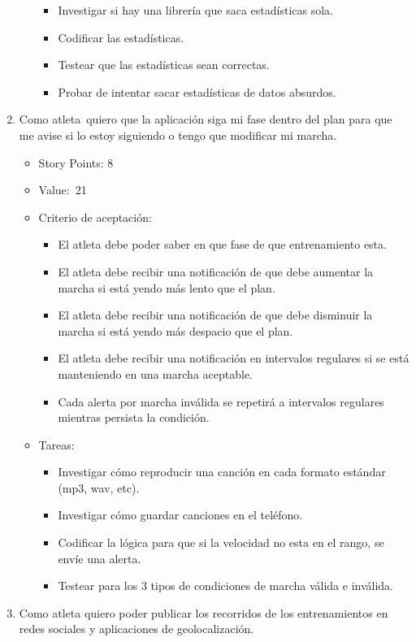 \begin{enumerate}
\begin{itemize}
    \begin{itemize}
    \item
      Investigar si hay una librería que saca estadísticas sola.
    \item
      Codificar las estadísticas.
    \item
      Testear que las estadísticas sean correctas.
    \item
      Probar de intentar sacar estadísticas de datos absurdos.
    \end{itemize}
  \end{itemize}
\item
  Como atleta~quiero que la aplicación siga mi fase dentro del plan para
  que me avise si lo estoy siguiendo o tengo que modificar mi marcha.

  \begin{itemize}
  \item
    Story Points: 8
  \item
    Value:~21
  \item
    Criterio de aceptación:

    \begin{itemize}
    \item
      El atleta debe poder saber en que fase de que entrenamiento esta.
    \item
      El atleta debe recibir una notificación de que debe aumentar la
      marcha si está yendo más lento que el plan.
    \item
      El atleta debe recibir una notificación de que debe disminuir la
      marcha si está yendo más despacio que el plan.
    \item
      El atleta debe recibir una notificación en intervalos regulares si
      se está manteniendo en una marcha aceptable.
    \item
      Cada alerta por marcha inválida se repetirá a intervalos regulares
      mientras persista la condición.
    \end{itemize}
  \item
    Tareas:

    \begin{itemize}
    \item
      Investigar cómo reproducir una canción en cada formato estándar
      (mp3, wav, etc).
    \item
      Investigar cómo guardar canciones en el teléfono.
    \item
      Codificar la lógica para que si la velocidad no esta en el rango,
      se envíe una alerta.
    \item
      Testear para los 3 tipos de condiciones de marcha válida e
      inválida.
    \end{itemize}
  \end{itemize}
\item
  Como atleta quiero poder publicar los recorridos de los entrenamientos
  en redes sociales y aplicaciones de geolocalización.


\end{enumerate}
